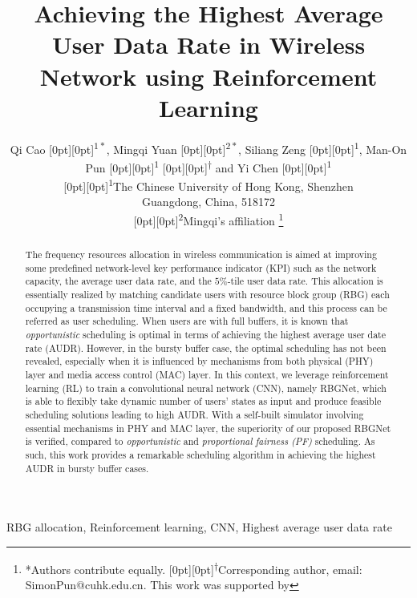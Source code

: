 \documentclass[conference,compsocconf]{IEEEtran}
\DeclareRobustCommand*{\IEEEauthorrefmark}[1]{%
	\raisebox{0pt}[0pt][0pt]{\textsuperscript{\footnotesize\ensuremath{#1}}}}
\begin{document}
	\title{Achieving the Highest Average User Data Rate in Wireless Network using Reinforcement Learning}
	\author{Qi Cao\IEEEauthorrefmark{1*}, Mingqi Yuan\IEEEauthorrefmark{2*}, Siliang Zeng\IEEEauthorrefmark{1}, Man-On Pun\IEEEauthorrefmark{1}\IEEEauthorrefmark{\dagger} and Yi Chen\IEEEauthorrefmark{1}\\
	\IEEEauthorrefmark{1}The Chinese University of Hong Kong, Shenzhen\\
	Guangdong, China, 518172\\
	\IEEEauthorrefmark{2}Mingqi's affiliation
	\thanks{*Authors contribute equally. \IEEEauthorrefmark{\dagger}Corresponding author, email: SimonPun@cuhk.edu.cn. This work was supported by}}
\maketitle
	
	\begin{abstract}
		The frequency resources allocation in wireless communication is aimed at improving some predefined network-level key performance indicator (KPI) such as the network capacity, the average user data rate, and the $5\%$-tile user data rate. This allocation is essentially realized by matching candidate users with resource block group (RBG) each occupying a transmission time interval and a fixed bandwidth, and this process can be referred as user scheduling. When users are with full buffers, it is known that \textit{opportunistic} scheduling is optimal in terms of achieving the highest average user date rate (AUDR). However, in the bursty buffer case, the optimal scheduling has not been revealed, especially when it is influenced by mechanisms from both physical (PHY) layer and media access control (MAC) layer. In this context, we leverage reinforcement learning (RL) to train a convolutional neural network (CNN), namely RBGNet, which is able to flexibly take dynamic number of users' states as input and produce feasible scheduling solutions leading to high AUDR. With a self-built simulator involving essential mechanisms in PHY and MAC layer, the superiority of our proposed RBGNet is verified, compared to \textit{opportunistic} and \textit{proportional fairness (PF)} scheduling. As such, this work provides a remarkable scheduling algorithm in achieving the highest AUDR in bursty buffer cases.
	\end{abstract}
	
	\begin{IEEEkeywords}
		RBG allocation, Reinforcement learning, CNN, Highest average user data rate
	\end{IEEEkeywords}
	
\end{document}
